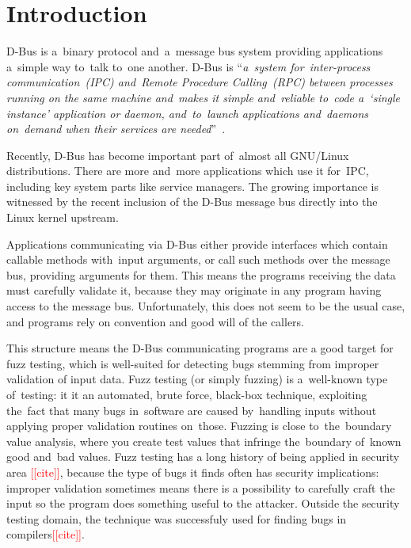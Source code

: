 \documentclass[conference]{IEEEtran}
\newcommand{\addtodo}[1]{\textcolor{red}{[[#1]]}}
\begin{document}
\section{Introduction}
D-Bus is a~binary protocol and~a~message bus system providing applications
a~simple way to~talk to~one another. D-Bus is ``\emph{a~system for~\mbox{inter-process}
communication~(IPC) and~Remote Procedure Calling~(RPC) between
processes running on the same machine and~makes it simple and~reliable to~code
a~`single instance' application or daemon, and~to~launch applications and~daemons
on~demand when their services are needed}''~\cite{DBUS}.

Recently, D-Bus has become important part of~almost all GNU/Linux
distributions. There are more and~more applications which use it for~IPC,
including key system parts like service managers. The growing importance is witnessed
by the recent inclusion of the D-Bus message bus directly into the Linux kernel
upstream.

Applications communicating via D-Bus either provide interfaces which contain callable
methods with~input arguments, or call such methods over
the message bus, providing arguments for them. This means the programs
receiving the data must carefully validate it, because they may originate in
any program having access to the message bus. Unfortunately, this does not seem
to be the usual case, and programs rely on convention and good will of the
callers.

This structure means the D-Bus communicating programs are a good target for
fuzz testing, which is well-suited for detecting bugs stemming from improper
validation of input data. Fuzz testing (or simply fuzzing) is a~well-known type
of~testing\cite{Fuzzing2,Fuzzing}: it it an automated, brute force, black-box
technique, exploiting the~fact that many bugs in~software are caused
by~handling inputs without applying proper validation routines on~those.
Fuzzing is close to~the~boundary value analysis, where you create test values
that infringe the~boundary of~known good and~bad values.  Fuzz testing has a
long history of being applied in security area \addtodo{cite}, because
the type of bugs it finds often has security implications: improper validation
sometimes means there is a possibility to carefully craft the input so the
program does something useful to the attacker. Outside the security testing
domain, the technique was successfuly used for finding bugs in
compilers\addtodo{cite}.
\end{document}
